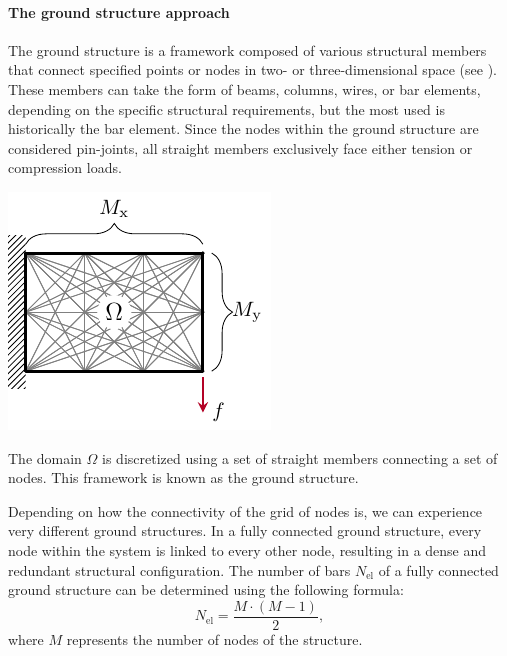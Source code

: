 \paragraph{The ground structure approach}
The ground structure is a framework composed of various structural members that connect specified points or nodes in two- or three-dimensional space (see ). These members can take the form of beams, columns, wires, or bar elements, depending on the specific structural requirements, but the most used is historically the bar element. Since the nodes within the ground structure are considered pin-joints, all straight members exclusively face either tension or compression loads. 
\begin{marginfigure}
    \centering
    \includegraphics{figures/02_literature/04_disc_mesh/d_mesh.pdf}
    \caption{The domain $\Omega$ is discretized using a set of straight members connecting a set of nodes. This framework is known as the ground structure.}
    \label{fig:02_mesh_d}
\end{marginfigure}

Depending on how the connectivity of the grid of nodes is, we can experience very different ground structures. In a fully connected ground structure, every node within the system is linked to every other node, resulting in a dense and redundant structural configuration. The number of bars $N_{\text{el}}$ of a fully connected ground structure can be determined using the following formula:
\begin{equation}
    N_{\text{el}} = \frac{M \cdot (M-1)}{2},
\end{equation}
where $M$ represents the number of nodes of the structure.

